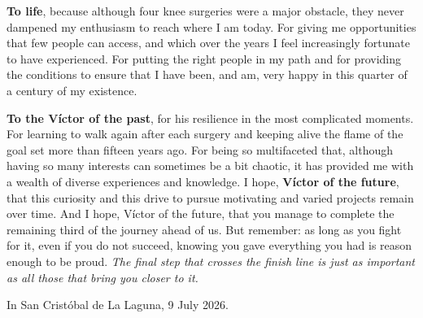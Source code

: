 \textbf{To life}, because although four knee surgeries were a major obstacle, they never dampened my enthusiasm to reach where I am today. For giving me opportunities that few people can access, and which over the years I feel increasingly fortunate to have experienced. For putting the right people in my path and for providing the conditions to ensure that I have been, and am, very happy in this quarter of a century of my existence.

\textbf{To the Víctor of the past}, for his resilience in the most complicated moments. For learning to walk again after each surgery and keeping alive the flame of the goal set more than fifteen years ago. For being so multifaceted that, although having so many interests can sometimes be a bit chaotic, it has provided me with a wealth of diverse experiences and knowledge. I hope, \textbf{Víctor of the future}, that this curiosity and this drive to pursue motivating and varied projects remain over time. And I hope, Víctor of the future, that you manage to complete the remaining third of the journey ahead of us. But remember: as long as you fight for it, even if you do not succeed, knowing you gave everything you had is reason enough to be proud. \textit{The final step that crosses the finish line is just as important as all those that bring you closer to it.}


\vspace{2cm}
\noindent
\begin{minipage}[t]{\textwidth}
	\raggedleft
	In San Cristóbal de La Laguna, 9 July 2026.
\end{minipage}